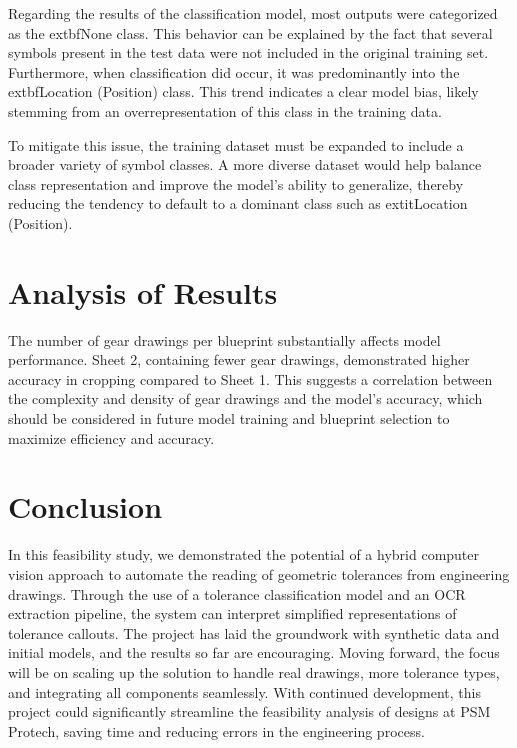 \documentclass[11pt,a4paper]{article}
\begin{document}
Regarding the results of the classification model, most outputs were categorized as the 	extbf{None} class. This behavior can be explained by the fact that several symbols present in the test data were not included in the original training set. Furthermore, when classification did occur, it was predominantly into the 	extbf{Location (Position)} class. This trend indicates a clear model bias, likely stemming from an overrepresentation of this class in the training data.

To mitigate this issue, the training dataset must be expanded to include a broader variety of symbol classes. A more diverse dataset would help balance class representation and improve the model’s ability to generalize, thereby reducing the tendency to default to a dominant class such as 	extit{Location (Position)}.

\section*{Analysis of Results}

The number of gear drawings per blueprint substantially affects model performance. Sheet 2, containing fewer gear drawings, demonstrated higher accuracy in cropping compared to Sheet 1. This suggests a correlation between the complexity and density of gear drawings and the model’s accuracy, which should be considered in future model training and blueprint selection to maximize efficiency and accuracy.

\section{Conclusion}
In this feasibility study, we demonstrated the potential of a hybrid computer vision approach to automate the reading of geometric tolerances from engineering drawings. Through the use of a tolerance classification model and an OCR extraction pipeline, the system can interpret simplified representations of tolerance callouts. The project has laid the groundwork with synthetic data and initial models, and the results so far are encouraging. Moving forward, the focus will be on scaling up the solution to handle real drawings, more tolerance types, and integrating all components seamlessly. With continued development, this project could significantly streamline the feasibility analysis of designs at PSM Protech, saving time and reducing errors in the engineering process.
\end{document}
